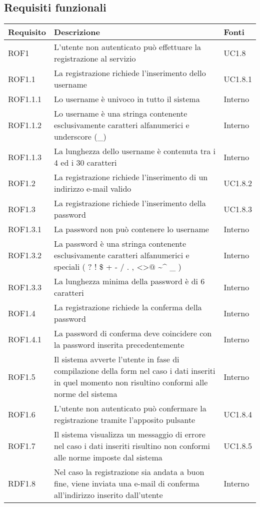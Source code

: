 \subsection{Requisiti funzionali}

\begin{center}

	\def\arraystretch{1.5}
	\bgroup
	\begin{longtable}{| p{2cm} | p{8cm} | p{2cm} |}

		\hline
		\textbf{Requisito} & \textbf{Descrizione} & \textbf{Fonti} \\
		\hline

		ROF1  &  L'utente non autenticato può effettuare la registrazione al servizio  &  UC1.8 \\
		\hline
		ROF1.1  &  La registrazione richiede l'inserimento dello username  &  UC1.8.1 \\
		\hline
		ROF1.1.1  &  Lo username è univoco in tutto il sistema  &  Interno \\
		\hline
		ROF1.1.2  &  Lo username è una stringa contenente esclusivamente caratteri alfanumerici e underscore (\_)  &  Interno \\
		\hline
		ROF1.1.3  &  La lunghezza dello username è contenuta tra i 4 ed i 30 caratteri  &  Interno \\
		\hline
		ROF1.2  &  La registrazione richiede l'inserimento di un indirizzo e-mail valido &  UC1.8.2 \\
		\hline
		ROF1.3  &  La registrazione richiede l'inserimento della password  &  UC1.8.3 \\
		\hline
		ROF1.3.1  &  La password non può contenere lo username  &  Interno \\
		\hline
		ROF1.3.2  &  La password è una stringa contenente esclusivamente caratteri alfanumerici e speciali ( ? ! \$ + - / . , \textless \textgreater $@$ \textasciitilde \^{} \_ )  &  Interno \\
		\hline
		ROF1.3.3  &  La lunghezza minima della password è di 6 caratteri  &  Interno \\
		\hline
		ROF1.4  &  La registrazione richiede la conferma della password  &  Interno \\
		\hline
		ROF1.4.1  &  La password di conferma deve coincidere con la password inserita precedentemente  &  Interno \\
		\hline
		ROF1.5  &  Il sistema avverte l'utente in fase di compilazione della form nel caso i dati inseriti in quel momento non risultino conformi alle norme del sistema  &  Interno \\
		\hline
		ROF1.6  &  L'utente non autenticato può confermare la registrazione tramite l'apposito pulsante  &  UC1.8.4 \\
		\hline
		ROF1.7  &  Il sistema visualizza un messaggio di errore nel caso i dati inseriti risultino non conformi alle norme imposte dal sistema  &  UC1.8.5 \\
		\hline
		RDF1.8  &  Nel caso la registrazione sia andata a buon fine, viene inviata una e-mail di conferma all'indirizzo inserito dall'utente  &  Interno \\
		\hline



\end{longtable}
\end{center}
